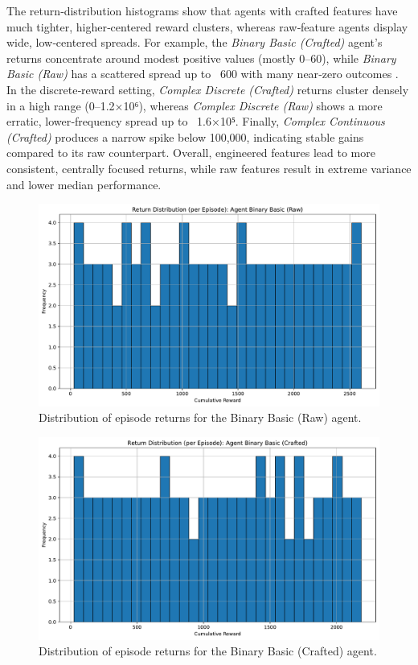 \documentclass[sigconf]{acmart}
\begin{document}
The return‐distribution histograms show that agents with crafted features have much tighter, higher‐centered reward clusters, whereas raw‐feature agents display wide, low‐centered spreads. For example, the \emph{Binary Basic (Crafted)} agent’s returns concentrate around modest positive values (mostly 0–60), while \emph{Binary Basic (Raw)} has a scattered spread up to ~600 with many near‐zero outcomes . In the discrete‐reward setting, \emph{Complex Discrete (Crafted)} returns cluster densely in a high range (0–1.2×10⁶), whereas \emph{Complex Discrete (Raw)} shows a more erratic, lower‐frequency spread up to ~1.6×10⁵. Finally, \emph{Complex Continuous (Crafted)} produces a narrow spike below 100,000, indicating stable gains compared to its raw counterpart. Overall, engineered features lead to more consistent, centrally focused returns, while raw features result in extreme variance and lower median performance.

\bigskip

\begin{figure}[t]
  \centering
  \includegraphics[width=\textwidth]{return_distribution_Binary Basic (Raw).pdf}
  \caption{Distribution of episode returns for the Binary Basic (Raw) agent.}
  \label{fig:return_distribution_Binary Basic (Raw)}
\end{figure}

\begin{figure}[t]
  \centering
  \includegraphics[width=\textwidth]{return_distribution_Binary Basic (Crafted).pdf}
  \caption{Distribution of episode returns for the Binary Basic (Crafted) agent.}
  \label{fig:return_distribution_Binary Basic (Crafted)}
\end{figure}
\end{document}
